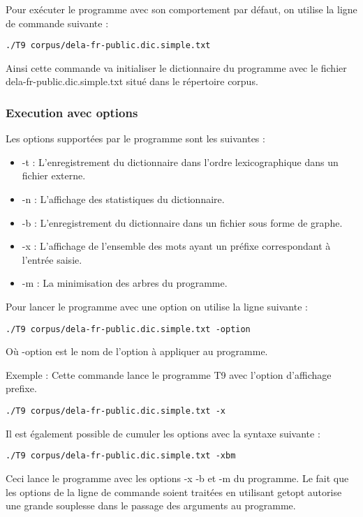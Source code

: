 \documentclass[15pt, a4paper]{article}
\begin{document}
Pour exécuter le programme avec son comportement par défaut, on utilise la ligne de commande suivante : 

\begin{verbatim}
./T9 corpus/dela-fr-public.dic.simple.txt
\end{verbatim}

Ainsi cette commande va initialiser le dictionnaire du programme avec le fichier 
dela-fr-public.dic.simple.txt situé dans le répertoire corpus. 

\subsubsection{Execution avec options}

\noindent Les options supportées par le programme sont les suivantes :

\begin{itemize}
\item -t : L'enregistrement du dictionnaire dans l'ordre lexicographique dans un fichier externe.
\item -n : L'affichage des statistiques du dictionnaire.
\item -b : L'enregistrement du dictionnaire dans un fichier sous forme de graphe.
\item -x : L'affichage de l'ensemble des mots ayant un préfixe correspondant à l'entrée saisie.
\item -m : La minimisation des arbres du programme.
\end{itemize}

\bigskip

\noindent Pour lancer le programme avec une option on utilise la ligne suivante :

\begin{verbatim}
./T9 corpus/dela-fr-public.dic.simple.txt -option
\end{verbatim}

\noindent Où -option est le nom de l'option à appliquer au programme.

\bigskip

\noindent Exemple : Cette commande lance le programme T9 avec l'option d'affichage prefixe.

\begin{verbatim}
./T9 corpus/dela-fr-public.dic.simple.txt -x
\end{verbatim}

\bigskip

Il est également possible de cumuler les options avec la syntaxe suivante :
\begin{verbatim}
./T9 corpus/dela-fr-public.dic.simple.txt -xbm
\end{verbatim}
Ceci lance le programme avec les options -x -b et -m du programme. Le fait que les options de 
la ligne de commande soient traitées en utilisant getopt autorise une grande souplesse dans
le passage des arguments au programme.
\end{document}
